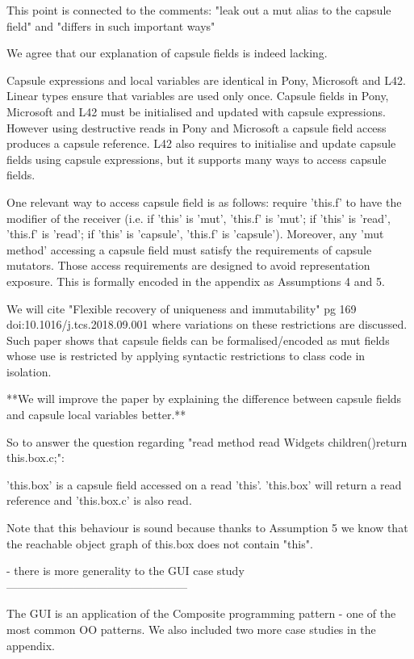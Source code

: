 This point is connected to the comments: "leak out a mut alias to the capsule field" and "differs in such important ways"

We agree that our explanation of capsule fields is indeed lacking.

Capsule expressions and local variables are identical in Pony, Microsoft and L42.
Linear types ensure that variables are used only once.
Capsule fields in Pony, Microsoft and L42 must be initialised and updated with capsule expressions.
However using destructive reads in Pony and Microsoft a capsule field access produces a capsule reference.
L42 also requires to initialise and update capsule fields using capsule expressions,
but it supports many ways to access capsule fields.

One relevant way to access capsule field is as follows: require 'this.f' to have the modifier of the receiver
(i.e. if 'this' is 'mut', 'this.f' is 'mut'; if 'this' is 'read', 'this.f' is 'read'; if 'this' is 'capsule', 'this.f' is 'capsule').
Moreover, any 'mut method' accessing a capsule field must satisfy the requirements of capsule mutators.
Those access requirements are designed to avoid representation exposure.
This is formally encoded in the appendix as Assumptions 4 and 5.

We will cite "Flexible recovery of uniqueness and immutability" 
pg 169 doi:10.1016/j.tcs.2018.09.001 where variations on these restrictions are discussed.
Such paper shows that capsule fields can be formalised/encoded as mut fields whose use is restricted
by applying syntactic restrictions to class code in isolation.

**We will improve the paper by explaining the difference between capsule fields and capsule local variables better.**


So to answer the question regarding "read method read Widgets children(){return this.box.c;}":

'this.box' is a capsule field accessed on a read 'this'. 'this.box' will return a read reference
and 'this.box.c' is also read.

Note that this behaviour is sound because thanks to Assumption 5 we know that the reachable object graph
of this.box does not contain "this".


- there is more generality to the GUI case study
------------------------------------------------

The GUI is an application of the Composite programming pattern - one of the most common OO patterns.
We also included two more case studies in the appendix.

